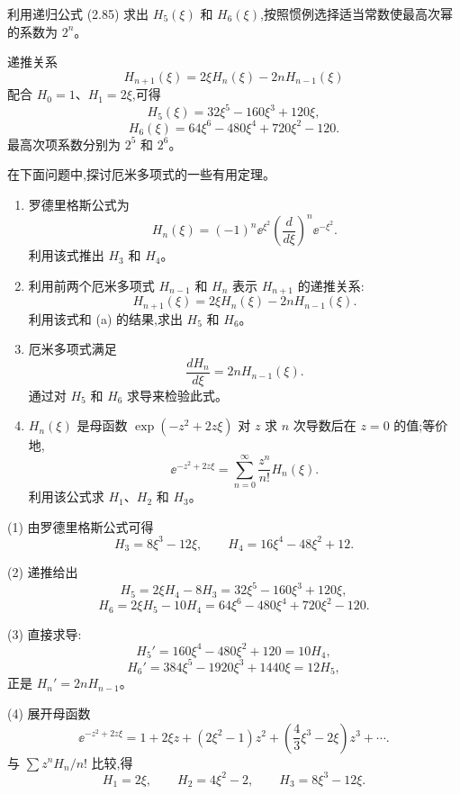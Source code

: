 \begin{question}
利用递归公式 (2.85) 求出 $H_5(\xi)$ 和 $H_6(\xi)$,按照惯例选择适当常数使最高次幂的系数为 $2^n$。

\par\smallskip
{}

\begin{solution}
递推关系
\[
H_{n+1}(\xi)=2\xi H_n(\xi)-2nH_{n-1}(\xi)
\]
配合 $H_0=1$、$H_1=2\xi$,可得
\[
H_5(\xi)=32\xi^5-160\xi^3+120\xi,
\]
\[
H_6(\xi)=64\xi^6-480\xi^4+720\xi^2-120.
\]
最高次项系数分别为 $2^5$ 和 $2^6$。
\end{solution}
\end{question}

\begin{question}
在下面问题中,探讨厄米多项式的一些有用定理。
\begin{enumerate}
\item 罗德里格斯公式为
\[
H_n(\xi)=(-1)^n \ee^{\xi^2}\left(\frac{d}{d\xi}\right)^n \ee^{-\xi^2} .
\]
利用该式推出 $H_3$ 和 $H_4$。
\item 利用前两个厄米多项式 $H_{n-1}$ 和 $H_n$ 表示 $H_{n+1}$ 的递推关系:
\[
H_{n+1}(\xi)=2\xi H_n(\xi)-2nH_{n-1}(\xi).
\]
利用该式和 (a) 的结果,求出 $H_5$ 和 $H_6$。
\item 厄米多项式满足
\[
\frac{dH_n}{d\xi}=2nH_{n-1}(\xi).
\]
通过对 $H_5$ 和 $H_6$ 求导来检验此式。
\item $H_n(\xi)$ 是母函数 $\exp(-z^2+2z\xi)$ 对 $z$ 求 $n$ 次导数后在 $z=0$ 的值;等价地,
\[
\ee^{-z^2+2z\xi}=\sum_{n=0}^{\infty}\frac{z^n}{n!}H_n(\xi).
\]
利用该公式求 $H_1$、$H_2$ 和 $H_3$。
\end{enumerate}
\begin{solution}
(1) 由罗德里格斯公式可得
\[
H_3=8\xi^3-12\xi,
\qquad
H_4=16\xi^4-48\xi^2+12.
\]

(2) 递推给出
\[
H_5=2\xi H_4-8H_3=32\xi^5-160\xi^3+120\xi,
\]
\[
H_6=2\xi H_5-10H_4=64\xi^6-480\xi^4+720\xi^2-120.
\]

(3) 直接求导:
\[
H_5'=160\xi^4-480\xi^2+120=10H_4,
\]
\[
H_6'=384\xi^5-1920\xi^3+1440\xi=12H_5,
\]
正是 $H_n'=2nH_{n-1}$。

(4) 展开母函数
\[
\ee^{-z^2+2z\xi}=1+2\xi z+(2\xi^2-1)z^2+\left(\frac43\xi^3-2\xi\right)z^3+\cdots.
\]
与 $\sum z^nH_n/n!$ 比较,得
\[
H_1=2\xi,
\qquad H_2=4\xi^2-2,
\qquad H_3=8\xi^3-12\xi.
\]
\end{solution}
\end{question}

